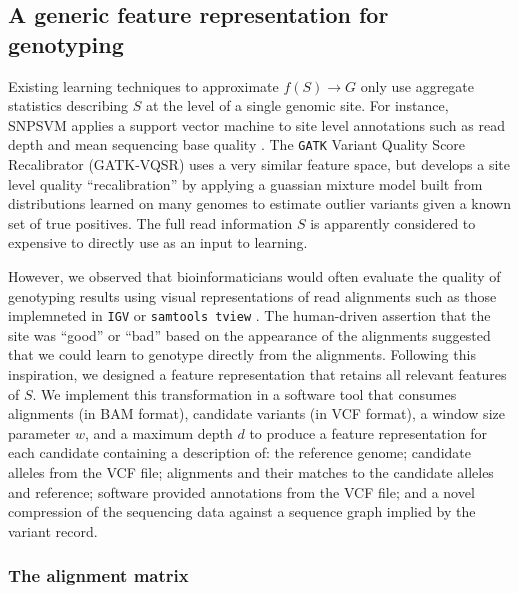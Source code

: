 \documentclass{article}
\begin{document}
\subsection{A generic feature representation for genotyping}

Existing learning techniques to approximate $f(S) \to G$ only use aggregate statistics describing $S$ at the level of a single genomic site.
For instance, SNPSVM applies a support vector machine to site level annotations such as read depth and mean sequencing base quality \cite{o2013support}.
The {\tt GATK} Variant Quality Score Recalibrator (GATK-VQSR) uses a very similar feature space, but develops a site level quality ``recalibration'' by applying a guassian mixture model built from distributions learned on many genomes to estimate outlier variants given a known set of true positives.
The full read information $S$ is apparently considered to expensive to directly use as an input to learning.

However, we observed that bioinformaticians would often evaluate the quality of genotyping results using visual representations of read alignments such as those implemneted in {\tt IGV} or {\tt samtools tview} \cite{robinson2011integrative, samtools}.
The human-driven assertion that the site was ``good'' or ``bad'' based on the appearance of the alignments suggested that we could learn to genotype directly from the alignments.
Following this inspiration, we designed a feature representation that retains all relevant features of $S$.
We implement this transformation in a software tool that consumes alignments (in BAM format), candidate variants (in VCF format), a window size parameter $w$, and a maximum depth $d$ to produce a feature representation for each candidate containing a description of: the reference genome; candidate alleles from the VCF file; alignments and their matches to the candidate alleles and reference; software provided annotations from the VCF file; and a novel compression of the sequencing data against a sequence graph implied by the variant record.

\subsubsection{The alignment matrix}

\end{document}
